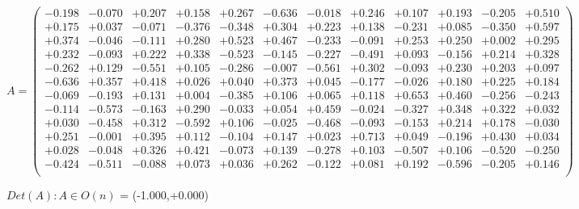 \documentclass[9pt]{article}
\theoremstyle{plain}
\theoremstyle{definition}
\theoremstyle{remark}
\numberwithin{equation}{section}
\begin{document}
$A = \left(
\begin{array}{
cccccccccccc}
-0.198 & -0.070 & +0.207 & +0.158 & +0.267 & -0.636 & -0.018 & +0.246 & +0.107 & +0.193 & -0.205 & +0.510 \\
+0.175 & +0.037 & -0.071 & -0.376 & -0.348 & +0.304 & +0.223 & +0.138 & -0.231 & +0.085 & -0.350 & +0.597 \\
+0.374 & -0.046 & -0.111 & +0.280 & +0.523 & +0.467 & -0.233 & -0.091 & +0.253 & +0.250 & +0.002 & +0.295 \\
+0.232 & -0.093 & +0.222 & +0.338 & -0.523 & -0.145 & -0.227 & -0.491 & +0.093 & -0.156 & +0.214 & +0.328 \\
-0.262 & +0.129 & -0.551 & +0.105 & -0.286 & -0.007 & -0.561 & +0.302 & -0.093 & +0.230 & +0.203 & +0.097 \\
-0.636 & +0.357 & +0.418 & +0.026 & +0.040 & +0.373 & +0.045 & -0.177 & -0.026 & +0.180 & +0.225 & +0.184 \\
-0.069 & -0.193 & +0.131 & +0.004 & -0.385 & +0.106 & +0.065 & +0.118 & +0.653 & +0.460 & -0.256 & -0.243 \\
-0.114 & -0.573 & -0.163 & +0.290 & -0.033 & +0.054 & +0.459 & -0.024 & -0.327 & +0.348 & +0.322 & +0.032 \\
+0.030 & -0.458 & +0.312 & -0.592 & +0.106 & -0.025 & -0.468 & -0.093 & -0.153 & +0.214 & +0.178 & -0.030 \\
+0.251 & -0.001 & +0.395 & +0.112 & -0.104 & +0.147 & +0.023 & +0.713 & +0.049 & -0.196 & +0.430 & +0.034 \\
+0.028 & -0.048 & +0.326 & +0.421 & -0.073 & +0.139 & -0.278 & +0.103 & -0.507 & +0.106 & -0.520 & -0.250 \\
-0.424 & -0.511 & -0.088 & +0.073 & +0.036 & +0.262 & -0.122 & +0.081 & +0.192 & -0.596 & -0.205 & +0.146 \\
\end{array}
\right)$ \newline 

$Det(A) :   A \in O(n)$ = (-1.000,+0.000)
\end{document}
